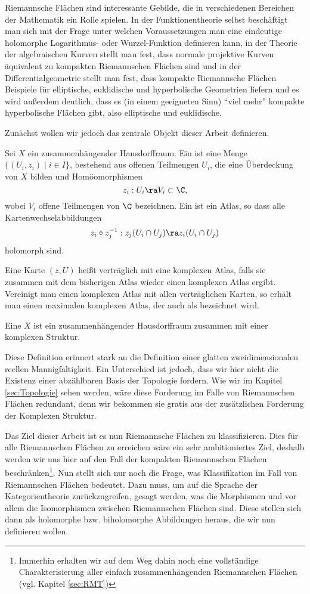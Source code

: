 Riemannsche Flächen sind interessante Gebilde, die in verschiedenen
Bereichen der Mathematik ein Rolle spielen. In der Funktionentheorie
selbst beschäftigt man sich mit der Frage unter welchen
Voraussetzungen man eine eindeutige holomorphe Logarithmus- oder
Wurzel-Funktion definieren kann, in der Theorie der algebraischen
Kurven stellt man fest, dass normale projektive Kurven äquivalent zu
kompakten Riemannschen Flächen sind und in der Differentialgeometrie
stellt man fest, dass kompakte Riemannsche Flächen Beispiele für
elliptische, euklidische und hyperbolische Geometrien liefern und es
wird außerdem deutlich, dass es (in einem geeigneten Sinn) "`viel
mehr"' kompakte hyperbolische Flächen gibt, also elliptische und euklidische.

Zunächst wollen wir jedoch das zentrale Objekt dieser Arbeit
definieren.

\begin{defin}
  \label{def:rf}
  Sei $X$ ein zusammenhängender Hausdorffraum. Ein 
  ist eine Menge $\{(U_i, z_i) \mid i \in I\}$, bestehend aus
  offenen Teilmengen $U_i$, die eine Überdeckung von $X$ bilden und
  Homöomorphismen
  \[
  z_i: U_i \ra V_i \subset \C,
  \]
  wobei $V_i$ offene Teilmengen von $\C$ bezeichnen. Ein
   ist ein Atlas, so dass alle
  Kartenwechselabbildungen
  \[
  z_i \circ z_j^{-1} : z_j(U_i \cap U_j) \ra z_i(U_i \cap U_j)
  \]
  holomorph sind.

  Eine Karte $(z,U)$ heißt verträglich mit eine
  komplexen Atlas, falls sie zusammen mit dem bisherigen Atlas wieder
  einen komplexen Atlas ergibt. Vereinigt man einen komplexen Atlas mit allen
  verträglichen Karten, so erhält man einen maximalen komplexen
  Atlas, der auch als  bezeichnet wird.

  Eine  $X$ ist ein zusammenhängender
  Hausdorffraum zusammen mit einer komplexen Struktur.
\end{defin}

Diese Definition erinnert stark an die Definition einer glatten
zweidimensionalen reellen Mannigfaltigkeit. Ein Unterschied ist
jedoch, dass wir hier nicht die Existenz einer abzählbaren Basis der
Topologie fordern. Wie wir im Kapitel \ref{sec:Topologie}
sehen werden, wäre diese Forderung im Falle von Riemannschen Flächen
redundant, denn wir bekommen sie gratis aus der zusätzlichen Forderung
der Komplexen Struktur.

Das Ziel dieser Arbeit ist es nun Riemannsche Flächen zu
klassifizieren. Dies für alle Riemannschen Flächen zu erreichen wäre
ein sehr ambitioniertes Ziel, deshalb werden wir uns hier auf den Fall
der kompakten Riemannschen Flächen beschränken\footnote{Immerhin
  erhalten wir auf dem Weg dahin noch eine vollständige
  Charakterisierung aller einfach zusammenhängenden Riemannschen
  Flächen (vgl. Kapitel \ref{sec:RMT})}. Nun stellt sich nur noch die
Frage, was Klassifikation im Fall von Riemannschen Flächen
bedeutet. Dazu muss, um auf die Sprache der Kategorientheorie
zurückzugreifen, gesagt werden, was die Morphismen und vor allem die
Isomorphismen zwischen Riemannschen Flächen sind. Diese stellen sich
dann als holomorphe bzw. biholomorphe Abbildungen heraus, die wir nun
definieren wollen.

